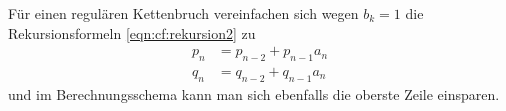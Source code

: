 Für einen regulären Kettenbruch vereinfachen sich wegen $b_k=1$ die
Rekursionsformeln \eqref{eqn:cf:rekursion2} zu
\begin{equation}
\begin{aligned}
p_n&= p_{n-2} + p_{n-1}a_n\\
q_n&= q_{n-2} + q_{n-1}a_n
\end{aligned}
\label{eqn:cf:rekursion3}
\end{equation}
und im Berechnungsschema kann man sich ebenfalls die oberste Zeile
einsparen.
\begin{center}
\end{center}

